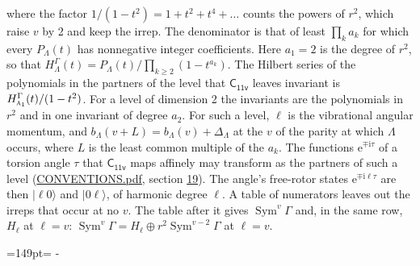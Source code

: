 \documentclass[10pt,a4paper]{article}
\newcommand{\needspace}[1]{\par\penalty-100\begingroup\dimen0=#1\relax\dimen2=\pagegoal
  \advance\dimen2-\pagetotal\ifdim\dimen0>\dimen2\relax\ifdim\dimen2>0pt\vfil\break\fi\fi
  \endgroup}
\numberwithin{equation}{section}
\newcommand{\grp}[1]{\mathsf{#1}}
\newcommand{\irr}[1]{\text{\normalfont\scshape #1}}
\newcommand{\iunit}{\mathrm{i}}
\newcommand{\expe}{\mathrm{e}}
\newcommand{\occ}[1]{\lvert #1\rangle}
\begin{document}
where the factor $1/(1 - t^2) = 1 + t^2 + t^4 + \dots$ counts the powers of $r^2$, which raise $v$ by 2 and keep the irrep. The denominator is that of least $\prod_k a_k$ for which every $P_\Lambda(t)$ has nonnegative integer coefficients. Here $a_1 = 2$ is the degree of $r^2$, so that $H^{\Gamma}_\Lambda(t) = P_\Lambda(t)/\prod_{k\ge2}(1 - t^{a_k})$. The Hilbert series of the polynomials in the partners of the level that $\grp{C_{11v}}$ leaves invariant is $H^{\Gamma}_{\irr{a}_{1}}(t)/(1 - t^2)$. For a level of dimension 2 the invariants are the polynomials in $r^2$ and in one invariant of degree $a_2$. \label{n:index.overtone.period}\label{n:index.increment.unitary}For such a level, $\ell$ is the vibrational angular momentum, and $b_\Lambda(v + L) = b_\Lambda(v) + \Delta_\Lambda$ at the $v$ of the parity at which $\Lambda$ occurs, where $L$ is the least common multiple of the $a_k$. \label{n:local.torsion.angle}The functions $\expe^{\mp\iunit\tau}$ of a torsion angle $\tau$ that $\grp{C_{11v}}$ maps affinely may transform as the partners of such a level (\href{../../CONVENTIONS.pdf}{CONVENTIONS.pdf}, section \href{../../CONVENTIONS.pdf\#conv.19}{19}). The angle's free-rotor states $\expe^{\mp\iunit\ell\tau}$ are then $\occ{\ell 0}$ and $\occ{0 \ell}$, of harmonic degree $\ell$. A table of numerators leaves out the irreps that occur at no $v$. The table after it gives $\operatorname{Sym}^{v}\Gamma$ and, in the same row, $H_\ell$ at $\ell = v$: $\operatorname{Sym}^{v}\Gamma = H_\ell \oplus r^2\operatorname{Sym}^{v-2}\Gamma$ at $\ell = v$.
\needspace{149pt}
\end{document}
